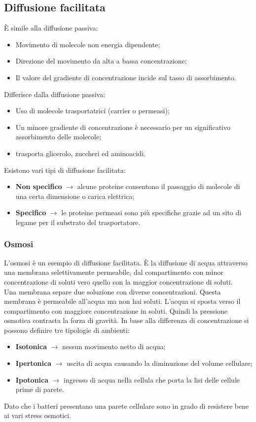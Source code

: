 \subsection{Diffusione facilitata}
\`E simile alla diffusione passiva:
\begin{itemize}
    \item Movimento di molecole non energia dipendente; 
    \item Direzione del movimento da alta a bassa concentrazione; 
    \item Il valore del gradiente di concentrazione incide sul tasso di assorbimento.
\end{itemize}
Differisce dalla diffusione passiva:
\begin{itemize}
    \item Uso di molecole trasportatrici (carrier o permeasi); 
    \item Un minore gradiente di concentrazione \`e necessario per un significativo assorbimento delle molecole; 
    \item trasporta glicerolo, zuccheri ed aminoacidi.
\end{itemize}
Esistono vari tipi di diffusione facilitata:
\begin{itemize}
    \item \textbf{Non specifico} $\xrightarrow{}$ alcune proteine consentono il passaggio di molecole di una certa dimensione o carica elettrica; 
    \item \textbf{Specifico} $\xrightarrow{}$ le proteine permeasi sono pi\`u specifiche grazie ad un sito di legame per il substrato del trasportatore.
\end{itemize}
\subsubsection{Osmosi}
L'osmosi \`e un esempio di diffusione facilitata. \`E la diffusione di acqua attraverso una membrana selettivamente permeabile, dal compartimento con minor concentrazione di soluti vero quello con la maggior concentrazione di soluti. 
\\Una membrana separe due soluzione con diverse concentrazioni. Questa membrana \`e permeabile all'acqua ma non hai soluti. L'acqua si sposta verso il compartimento con maggiore concentrazione in soluti. Quindi la pressione osmotica contrasta la forza di gravit\`a.
In base alla differenza di concentrazione si possono definire tre tipologie di ambienti: 
\begin{itemize}
    \item \textbf{Isotonica} $\xrightarrow{}$ nessun movimento netto di acqua; 
    \item \textbf{Ipertonica} $\xrightarrow{}$ uscita di acqua causando la diminuzione del volume cellulare; 
    \item \textbf{Ipotonica} $\xrightarrow{}$ ingresso di acqua nella cellula che porta la lisi delle cellule prime di parete.
\end{itemize}
Dato che i batteri presentano una parete cellulare sono in grado di resistere bene ai vari stress osmotici.
